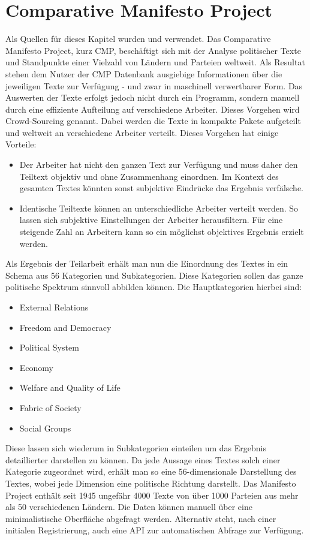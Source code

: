 \section{Comparative Manifesto Project}
Als Quellen für dieses Kapitel wurden \cite{csta} und \cite{cmp} verwendet.
Das Comparative Manifesto Project, kurz CMP, beschäftigt sich mit der Analyse politischer Texte und Standpunkte einer Vielzahl von Ländern und Parteien weltweit. Als Resultat stehen dem Nutzer der CMP Datenbank ausgiebige Informationen über die jeweiligen Texte zur Verfügung - und zwar in maschinell verwertbarer Form.
Das Auswerten der Texte erfolgt jedoch nicht durch ein Programm, sondern manuell durch eine effiziente Aufteilung auf verschiedene Arbeiter. Dieses Vorgehen wird Crowd-Sourcing genannt. Dabei werden die Texte in kompakte Pakete aufgeteilt und weltweit an verschiedene Arbeiter verteilt. Dieses Vorgehen hat einige Vorteile:
\begin{itemize}
\item Der Arbeiter hat nicht den ganzen Text zur Verfügung und muss daher den Teiltext objektiv und ohne Zusammenhang einordnen. Im Kontext des gesamten Textes könnten sonst subjektive Eindrücke das Ergebnis verfälsche.
\item Identische Teiltexte können an unterschiedliche Arbeiter verteilt werden. So lassen sich subjektive Einstellungen der Arbeiter herausfiltern. Für eine steigende Zahl an Arbeitern kann so ein möglichst objektives Ergebnis erzielt werden.
\end{itemize}
Als Ergebnis der Teilarbeit erhält man nun die Einordnung des Textes in ein Schema aus 56 Kategorien und Subkategorien. Diese Kategorien sollen das ganze politische Spektrum sinnvoll abbilden können. Die Hauptkategorien hierbei sind:
\begin{itemize}
\item External Relations
\item Freedom and Democracy
\item Political System
\item Economy
\item Welfare and Quality of Life
\item Fabric of Society
\item Social Groups
\end{itemize}
Diese lassen sich wiederum in Subkategorien einteilen um das Ergebnis detaillierter darstellen zu können. Da jede Aussage eines Textes solch einer Kategorie zugeordnet wird, erhält man so eine 56-dimensionale Darstellung des Textes, wobei jede Dimension eine politische Richtung darstellt.
Das Manifesto Project enthält seit 1945 ungefähr 4000 Texte von über 1000 Parteien aus mehr als 50 verschiedenen Ländern.
Die Daten können manuell über eine minimalistische Oberfläche abgefragt werden. Alternativ steht, nach einer initialen Registrierung, auch eine API zur automatischen Abfrage zur Verfügung.

